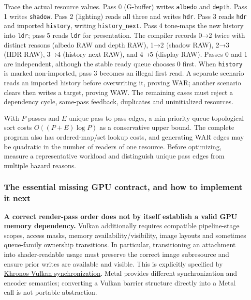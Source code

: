 Trace the actual resource values. Pass 0 (G-buffer) writes \texttt{albedo} and \texttt{depth}. Pass 1 writes \texttt{shadow}. Pass 2 (lighting) reads all three and writes \texttt{hdr}. Pass 3 reads \texttt{hdr} and imported \texttt{history}, writing \texttt{history\_next}. Pass 4 tone-maps the new history into \texttt{ldr}; pass 5 reads \texttt{ldr} for presentation. The compiler records 0→2 twice with distinct reasons (albedo RAW and depth RAW), 1→2 (shadow RAW), 2→3 (HDR RAW), 3→4 (history-next RAW), and 4→5 (display RAW). Passes 0 and 1 are independent, although the stable ready queue chooses 0 first. When \texttt{history} is marked non-imported, pass 3 becomes an illegal first read. A separate scenario reads an imported history before overwriting it, proving WAR; another scenario clears then writes a target, proving WAW. The remaining cases must reject a dependency cycle, same-pass feedback, duplicates and uninitialized resources.

With \(P\) passes and \(E\) unique pass-to-pass edges, a min-priority-queue topological sort costs \(O((P+E)\log P)\) as a conservative upper bound. The complete program also has ordered-map/set lookup costs, and generating WAR edges may be quadratic in the number of readers of one resource. Before optimizing, measure a representative workload and distinguish unique pass edges from multiple hazard reasons.

\subsubsection{The essential missing GPU contract, and how to implement it next}\label{the-essential-missing-gpu-contract-and-how-to-implement-it-next}

\textbf{A correct render-pass order does not by itself establish a valid GPU memory dependency.} Vulkan additionally requires compatible pipeline-stage scopes, access masks, memory availability/visibility, image layouts and sometimes queue-family ownership transitions. In particular, transitioning an attachment into shader-readable usage must preserve the correct image subresource and ensure prior writes are available and visible. This is explicitly specified by \href{https://docs.vulkan.org/spec/latest/chapters/synchronization.html}{Khronos Vulkan synchronization}. Metal provides different synchronization and encoder semantics; converting a Vulkan barrier structure directly into a Metal call is not portable abstraction.

